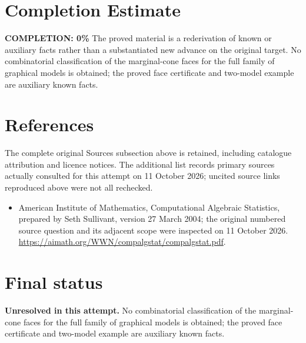 \documentclass[11pt]{article}
\begin{document}
\section{Completion Estimate}
\noindent\textbf{COMPLETION: 0\%}
The proved material is a rederivation of known or auxiliary facts rather than a substantiated new advance on the original target. No combinatorial classification of the marginal-cone faces for the full family of graphical models is obtained; the proved face certificate and two-model example are auxiliary known facts.
\section{References}
The complete original Sources subsection above is retained, including catalogue attribution and licence notices. The additional list records primary sources actually consulted for this attempt on 11 October 2026; uncited source links reproduced above were not all rechecked.
\begin{itemize}
\item American Institute of Mathematics, Computational Algebraic Statistics, prepared by Seth Sullivant, version 27 March 2004; the original numbered source question and its adjacent scope were inspected on 11 October 2026. \url{https://aimath.org/WWN/compalgstat/compalgstat.pdf}.
\end{itemize}
\section{Final status}
\textbf{Unresolved in this attempt.} No combinatorial classification of the marginal-cone faces for the full family of graphical models is obtained; the proved face certificate and two-model example are auxiliary known facts.
\end{document}
